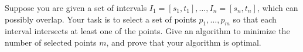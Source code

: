 \problem{}
Suppose you are given a set of intervals $I_1 = [s_1, t_1], \ldots, I_n = [s_n, t_n]$, which can possibly overlap.  Your task is to select a set of points $p_1, \ldots, p_m$ so that each interval intersects at least one of the points.  Give an algorithm to minimize the number of selected points $m$, and prove that your algorithm is optimal.

\solution{}
\newpage